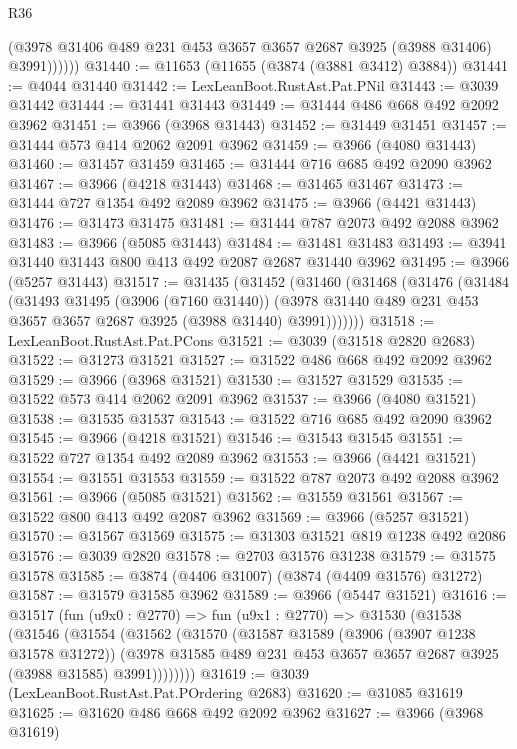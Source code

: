 \begin{lexlean}{R36}
\begin{coremodule}
              (@3978 @31406 @489 @231 @453 @3657 @3657 @2687 @3925 (@3988 @31406) @3991))))))
@31440 := @11653 (@11655 (@3874 (@3881 @3412) @3884))
@31441 := @4044 @31440
@31442 := LexLeanBoot.RustAst.Pat.PNil
@31443 := @3039 @31442
@31444 := @31441 @31443
@31449 := @31444 @486 @668 @492 @2092 @3962
@31451 := @3966 (@3968 @31443)
@31452 := @31449 @31451
@31457 := @31444 @573 @414 @2062 @2091 @3962
@31459 := @3966 (@4080 @31443)
@31460 := @31457 @31459
@31465 := @31444 @716 @685 @492 @2090 @3962
@31467 := @3966 (@4218 @31443)
@31468 := @31465 @31467
@31473 := @31444 @727 @1354 @492 @2089 @3962
@31475 := @3966 (@4421 @31443)
@31476 := @31473 @31475
@31481 := @31444 @787 @2073 @492 @2088 @3962
@31483 := @3966 (@5085 @31443)
@31484 := @31481 @31483
@31493 := @3941 @31440 @31443 @800 @413 @492 @2087 @2687 @31440 @3962
@31495 := @3966 (@5257 @31443)
@31517 := @31435
    (@31452
      (@31460
        (@31468
          (@31476
            (@31484
              (@31493
                @31495
                (@3906 (@7160 @31440))
                (@3978 @31440 @489 @231 @453 @3657 @3657 @2687 @3925 (@3988 @31440) @3991)))))))
@31518 := LexLeanBoot.RustAst.Pat.PCons
@31521 := @3039 (@31518 @2820 @2683)
@31522 := @31273 @31521
@31527 := @31522 @486 @668 @492 @2092 @3962
@31529 := @3966 (@3968 @31521)
@31530 := @31527 @31529
@31535 := @31522 @573 @414 @2062 @2091 @3962
@31537 := @3966 (@4080 @31521)
@31538 := @31535 @31537
@31543 := @31522 @716 @685 @492 @2090 @3962
@31545 := @3966 (@4218 @31521)
@31546 := @31543 @31545
@31551 := @31522 @727 @1354 @492 @2089 @3962
@31553 := @3966 (@4421 @31521)
@31554 := @31551 @31553
@31559 := @31522 @787 @2073 @492 @2088 @3962
@31561 := @3966 (@5085 @31521)
@31562 := @31559 @31561
@31567 := @31522 @800 @413 @492 @2087 @3962
@31569 := @3966 (@5257 @31521)
@31570 := @31567 @31569
@31575 := @31303 @31521 @819 @1238 @492 @2086
@31576 := @3039 @2820
@31578 := @2703 @31576 @31238
@31579 := @31575 @31578
@31585 := @3874 (@4406 @31007) (@3874 (@4409 @31576) @31272)
@31587 := @31579 @31585 @3962
@31589 := @3966 (@5447 @31521)
@31616 := @31517
    (fun (u9x0 : @2770) =>
    fun (u9x1 : @2770) =>
    @31530
      (@31538
        (@31546
          (@31554
            (@31562
              (@31570
                (@31587
                  @31589
                  (@3906 (@3907 @1238 @31578 @31272))
                  (@3978 @31585 @489 @231 @453 @3657 @3657 @2687 @3925 (@3988 @31585) @3991))))))))
@31619 := @3039 (LexLeanBoot.RustAst.Pat.POrdering @2683)
@31620 := @31085 @31619
@31625 := @31620 @486 @668 @492 @2092 @3962
@31627 := @3966 (@3968 @31619)

\end{coremodule}
\end{lexlean}
